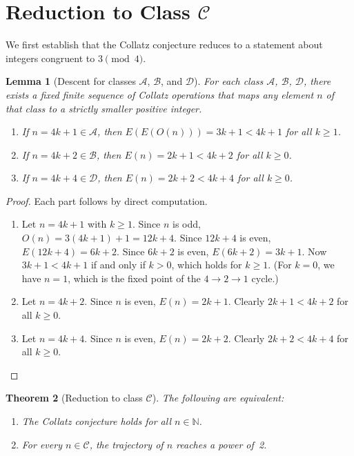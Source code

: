 \documentclass[11pt,a4paper]{article}
\theoremstyle{plain}
\newtheorem{theorem}{Theorem}[section]
\newtheorem{lemma}[theorem]{Lemma}
\theoremstyle{definition}
\newcommand{\N}{\mathbb{N}}
\begin{document}
\section{Reduction to Class \texorpdfstring{$\mathcal{C}$}{C}}
\label{sec:reduction}

We first establish that the Collatz conjecture reduces to a statement about integers congruent to $3 \pmod{4}$.

\begin{lemma}[Descent for classes $\mathcal{A}$, $\mathcal{B}$, and $\mathcal{D}$]\label{lem:descent}
  For each class $\mathcal{A}$, $\mathcal{B}$, $\mathcal{D}$, there exists a fixed finite sequence of Collatz operations that maps any element $n$ of that class to a strictly smaller positive integer.
  \begin{enumerate}[label=(\roman*)]
    \item If $n = 4k+1 \in \mathcal{A}$, then $E(E(O(n))) = 3k+1 < 4k+1$ for all $k \geq 1$.
    \item If $n = 4k+2 \in \mathcal{B}$, then $E(n) = 2k+1 < 4k+2$ for all $k \geq 0$.
    \item If $n = 4k+4 \in \mathcal{D}$, then $E(n) = 2k+2 < 4k+4$ for all $k \geq 0$.
  \end{enumerate}
\end{lemma}

\begin{proof}
  Each part follows by direct computation.
  \begin{enumerate}[label=(\roman*)]
    \item Let $n = 4k+1$ with $k \geq 1$. Since $n$ is odd, $O(n) = 3(4k+1)+1 = 12k+4$. Since $12k+4$ is even, $E(12k+4) = 6k+2$. Since $6k+2$ is even, $E(6k+2) = 3k+1$. Now $3k+1 < 4k+1$ if and only if $k > 0$, which holds for $k \geq 1$. (For $k=0$, we have $n=1$, which is the fixed point of the $4\to 2\to 1$ cycle.)
    \item Let $n = 4k+2$. Since $n$ is even, $E(n) = 2k+1$. Clearly $2k+1 < 4k+2$ for all $k \geq 0$.
    \item Let $n = 4k+4$. Since $n$ is even, $E(n) = 2k+2$. Clearly $2k+2 < 4k+4$ for all $k \geq 0$. \qedhere
  \end{enumerate}
\end{proof}

\begin{theorem}[Reduction to class $\mathcal{C}$]\label{thm:reduction}
  The following are equivalent:
  \begin{enumerate}[label=(\alph*)]
    \item The Collatz conjecture holds for all $n \in \N$.
    \item For every $n \in \mathcal{C}$, the trajectory of $n$ reaches a power of~2.
  \end{enumerate}
\end{theorem}
\end{document}
